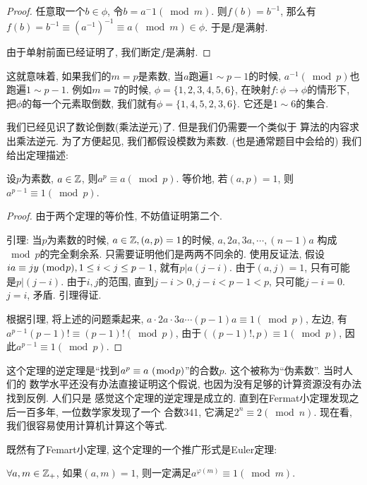 \begin{proof}
    任意取一个$b\in \phi$, 令$b=a^-1(\bmod m)$. 则$f(b)=b^{-1}$, 那么有 
    $f(b)=b^{-1}\equiv (a^{-1})^{-1}\equiv a (\bmod m)\in \phi$. 
    于是$f$是满射. 

    由于单射前面已经证明了, 我们断定$f$是满射. 
\end{proof}

这就意味着, 如果我们的$m=p$是素数, 当$a$跑遍$1\sim p-1$的时候, 
$a^{-1}(\bmod p)$也跑遍$1\sim 
p-1$. 例如$m=7$的时候, $\phi=\{1,2,3,4,5,6\}$, 在映射$f:\phi\to\phi$的情形下, 
把$\phi$的每一个元素取倒数, 我们就有$\phi=\{1,4,5,2,3,6\}$. 它还是$1\sim 6$的集合. 

  我们已经见识了数论倒数(乘法逆元)了. 但是我们仍需要一个类似于
算法的内容求出乘法逆元. 为了方便起见, 我们都假设模数为素数. (也是通常题目中会给的)
我们给出定理描述: 
\begin{theorem}
    设$p$为素数, $a\in{\mathbb Z}$, 则$a^p\equiv a (\bmod p)$. 等价地, 若$(a,p)=1$, 
    则$a^{p-1}\equiv 1(\bmod p)$. 
\end{theorem}

\begin{proof}
    由于两个定理的等价性, 不妨值证明第二个. 

    引理: 当$p$为素数的时候, $a\in {\mathbb Z},(a,p)=1$的时候, $a,2a,3a,\cdots,(n-1)a$
    构成$\bmod p$的完全剩余系. 只需要证明他们是两两不同余的. 使用反证法, 假设 
    ${ia} \equiv {jy} ~(\bmod {p}),1\leq i<j\leq p-1$, 就有$p|a(j-i)$. 由于$(a,j)=1$, 只有可能
    是$p|(j-i)$. 由于$i, j$的范围, 直到$j-i>0, j-i<p-1<p$, 只可能$j-i=0$. 
    $j=i$, 矛盾. 引理得证. 

    根据引理, 将上述的问题乘起来, $a\cdot 2a\cdot 3a\cdots(p-1)a
    \equiv 1(\bmod p)$,
    左边, 有$a^{p-1}(p-1)!\equiv (p-1)! (\bmod p)$, 由于$((p-1)!,p)\equiv 1(\bmod p)$, 因此$a^{p-1}\equiv 1(\bmod p)$. 
\end{proof}

这个定理的逆定理是``找到${a^p} \equiv {a} ~(\bmod {p})$''的合数$p$. 这个被称为``伪素数''. 当时人们的
数学水平还没有办法直接证明这个假说, 也因为没有足够的计算资源没有办法找到反例. 人们只是
感觉这个定理的逆定理是成立的. 直到在Fermat小定理发现之后一百多年, 一位数学家发现了一个
合数341, 它满足$2^n\equiv 2(\bmod n)$. 现在看, 我们很容易使用计算机计算这个等式. 

 既然有了Femart小定理, 这个定理的一个推广形式是Euler定理:  
\begin{theorem}
    $\forall a,m\in {\mathbb Z}_+$, 如果$(a,m)=1$, 则一定满足$a^{\varphi(m)}\equiv 1
    (\bmod m)$. 
\end{theorem}


